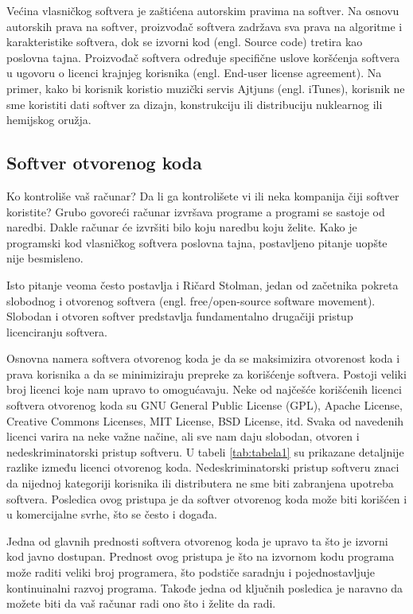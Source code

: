 \documentclass[a4paper]{article}
\begin{document}
Većina vlasničkog softvera je zaštićena autorskim pravima na softver. Na osnovu autorskih prava na softver,
proizvođač softvera zadržava sva prava na algoritme i karakteristike softvera, dok se izvorni kod (engl. Source code)
tretira kao poslovna tajna. Proizvođač softvera određuje specifične uslove koršćenja softvera u ugovoru o licenci 
krajnjeg korisnika (engl. End-user license agreement). Na primer, kako bi korisnik koristio muzički servis Ajtjuns (engl. iTunes),
korisnik ne sme koristiti dati softver za dizajn, konstrukciju ili distribuciju nuklearnog ili hemijskog oružja. \cite{apple}

\subsection{Softver otvorenog koda}
\label{softver_otvorenog_koda}

Ko kontroliše vaš računar? Da li ga kontrolišete vi ili neka kompanija čiji softver koristite? Grubo govoreći računar izvršava
programe a programi se sastoje od naredbi. Dakle računar će izvršiti bilo koju naredbu koju želite. Kako je programski kod 
vlasničkog softvera poslovna tajna, postavljeno pitanje uopšte nije besmisleno.

Isto pitanje veoma često postavlja i Ričard Stolman, jedan od začetnika pokreta slobodnog i otvorenog softvera 
(engl. free/open-source software movement). Slobodan i otvoren softver predstavlja fundamentalno drugačiji 
pristup licenciranju softvera.

Osnovna namera softvera otvorenog koda je da se maksimizira otvorenost koda i prava korisnika a da
se minimiziraju prepreke za korišćenje softvera. Postoji veliki broj licenci koje nam upravo to omogućavaju.
Neke od najčešće korišćenih licenci softvera otvorenog koda su GNU General Public License (GPL), Apache License,
Creative Commons Licenses, MIT License, BSD License, itd. Svaka od navedenih licenci varira na neke važne načine, ali sve nam daju 
slobodan, otvoren i nedeskriminatorski pristup softveru. U tabeli \ref{tab:tabela1} su prikazane detaljnije razlike između licenci otvorenog koda. 
Nedeskriminatorski pristup softveru znaci da nijednoj kategoriji korisnika ili distributera ne sme biti zabranjena upotreba softvera. \cite{opensource}
Posledica ovog pristupa je da softver otvorenog koda može biti korišćen i u komercijalne svrhe, što se često i događa.

Jedna od glavnih prednosti softvera otvorenog koda je upravo ta što je izvorni kod javno dostupan. \cite{opensource} Prednost ovog pristupa je 
što na izvornom kodu programa može raditi veliki broj programera, što podstiče saradnju i pojednostavljuje kontinuinalni 
razvoj programa. Takođe jedna od ključnih posledica je naravno da možete biti da vaš računar radi ono što i želite da radi. 
\end{document}
